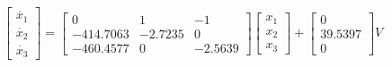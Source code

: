 \documentclass{article}
\begin{document}
\begin{equation}
\label{eq:ssval}
\left[ \begin{array}{c}
\dot{x_1} \\
\dot{x_2} \\
\dot{x_3} \end{array} \right]
=
\left[ \begin{array}{ccc}
0 & 1 & -1 \\
-414.7063 & -2.7235 & 0 \\
-460.4577 & 0 & -2.5639 \end{array} \right]
\left[ \begin{array}{c}
x_1 \\
x_2 \\
x_3  \end{array} \right]
+
\left[ \begin{array}{c}
0 				\\
39.5397 	\\
0				\end{array} \right]
V
\end{equation}

\begin{thebibliography}{widestlabel}
\end{thebibliography}
\end{document}
